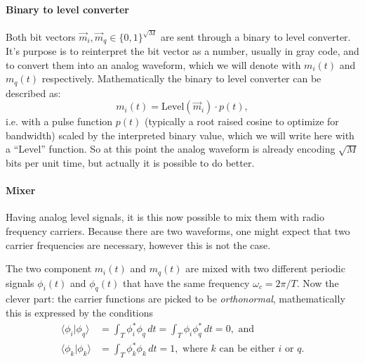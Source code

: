 \paragraph{Binary to level converter}


Both bit vectors \(\vec{m}_i, \vec{m}_q \in \{0,1\}^{\sqrt{M}}\) are sent through a binary to level converter. It's purpose is to reinterpret the bit vector as a number, usually in gray code, and to convert them into an analog waveform, which we will denote with \(m_i(t)\) and \(m_q(t)\) respectively. Mathematically the binary to level converter can be described as:
\begin{equation}
	m_i(t) = \text{Level}(\vec{m}_i) \cdot p(t),
\end{equation}
i.e. with a pulse function \(p(t)\) (typically a root raised cosine to optimize for bandwidth) scaled by the interpreted binary value, which we will write here with a ``Level'' function. So at this point the analog waveform is already encoding \(\sqrt{M}\) bits per unit time, but actually it is possible to do better.

\paragraph{Mixer}

Having analog level signals, it is this now possible to mix them with radio frequency carriers. Because there are two waveforms, one might expect that two carrier frequencies are necessary, however this is not the case.

The two component \(m_i(t)\) and \(m_q(t)\) are mixed with two different periodic signals \(\phi_i(t)\) and \(\phi_q(t)\) that have the same frequency \(\omega_c = 2\pi / T\). Now the clever part: the carrier functions are picked to be \emph{orthonormal}, mathematically this is expressed by the conditions
\begin{subequations}
	\begin{align}
		\langle \phi_i | \phi_q \rangle
			&= \int_T \phi_i^* \phi_q \, dt = \int_T \phi_i \phi_q^* \, dt
			= 0, \text{ and } \\
		\langle \phi_k | \phi_k \rangle
			&= \int_T \phi_k^* \phi_k \,dt = 1,
			\text{ where } k \text{ can be either } i \text{ or } q.
	\end{align}
\end{subequations}

